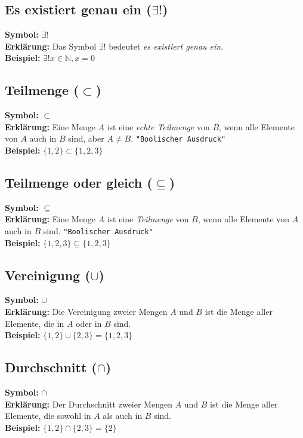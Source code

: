 \documentclass[12pt,a4paper]{article}
\begin{document}
\subsection{Es existiert genau ein (\texorpdfstring{$\exists !$}{exists!})}
\textbf{Symbol:} $\exists !$ \\
\textbf{Erklärung:} Das Symbol $\exists !$ bedeutet \textit{es existiert genau ein}. \\
\textbf{Beispiel:} $\exists ! x \in \mathbb{N}, x = 0$

\subsection{Teilmenge (\texorpdfstring{$\subset$}{subset})}
\textbf{Symbol:} $\subset$ \\
\textbf{Erklärung:} Eine Menge $A$ ist eine \emph{echte Teilmenge} von $B$, wenn alle Elemente von $A$ auch in $B$ sind, aber $A \neq B$. \texttt{"Boolischer Ausdruck"} \\
\textbf{Beispiel:} $\{1,2\} \subset \{1,2,3\}$

\subsection{Teilmenge oder gleich (\texorpdfstring{$\subseteq$}{subseteq})}
\textbf{Symbol:} $\subseteq$ \\
\textbf{Erklärung:} Eine Menge $A$ ist eine \emph{Teilmenge} von $B$, wenn alle Elemente von $A$ auch in $B$ sind. \texttt{"Boolischer Ausdruck"} \\
\textbf{Beispiel:} $\{1,2,3\} \subseteq \{1,2,3\}$

\subsection{Vereinigung (\texorpdfstring{$\cup$}{cup})}
\textbf{Symbol:} $\cup$ \\
\textbf{Erklärung:} Die Vereinigung zweier Mengen $A$ und $B$ ist die Menge aller Elemente, die in $A$ oder in $B$ sind. \\
\textbf{Beispiel:} $\{1,2\} \cup \{2,3\} = \{1,2,3\}$

\subsection{Durchschnitt (\texorpdfstring{$\cap$}{cap})}
\textbf{Symbol:} $\cap$ \\
\textbf{Erklärung:} Der Durchschnitt zweier Mengen $A$ und $B$ ist die Menge aller Elemente, die sowohl in $A$ als auch in $B$ sind. \\
\textbf{Beispiel:} $\{1,2\} \cap \{2,3\} = \{2\}$
\end{document}
